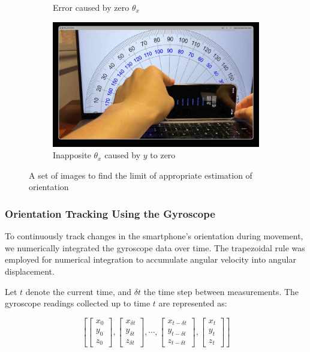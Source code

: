 \documentclass{article}
\begin{document}
\begin{figure}[h]
\begin{subfigure}{0.5\textwidth}
        \caption{Error caused by zero $\theta_x$}
        \label{fig:2_1_3_3}
    \end{subfigure}
    \begin{subfigure}{0.5\textwidth}
        \includegraphics[width=\textwidth]{Images/2_1_3_4.jpg}
        \caption{Inapposite $\theta_x$ caused by $y$ to zero}
        \label{fig:2_1_3_4}
    \end{subfigure}
    \caption{A set of images to find the limit of appropriate estimation of orientation}
    \label{fig:valid_range_test}
\end{figure}


\subsubsection{Orientation Tracking Using the Gyroscope}

To continuously track changes in the smartphone’s orientation during movement, we numerically integrated the gyroscope data over time. The trapezoidal rule was employed for numerical integration to accumulate angular velocity into angular displacement.

Let $t$ denote the current time, and $\delta t$ the time step between measurements. The gyroscope readings collected up to time $t$ are represented as:

\[
\left[
\begin{bmatrix}x_0\\y_0\\z_0\end{bmatrix},
\begin{bmatrix}x_{\delta t}\\y_{\delta t}\\z_{\delta t} \end{bmatrix},
\cdots,
\begin{bmatrix}x_{t-\delta t}\\y_{t-\delta t}\\z_{t-\delta t} \end{bmatrix},
\begin{bmatrix}x_t\\y_t\\z_t \end{bmatrix}
\right]
\]
\end{document}
